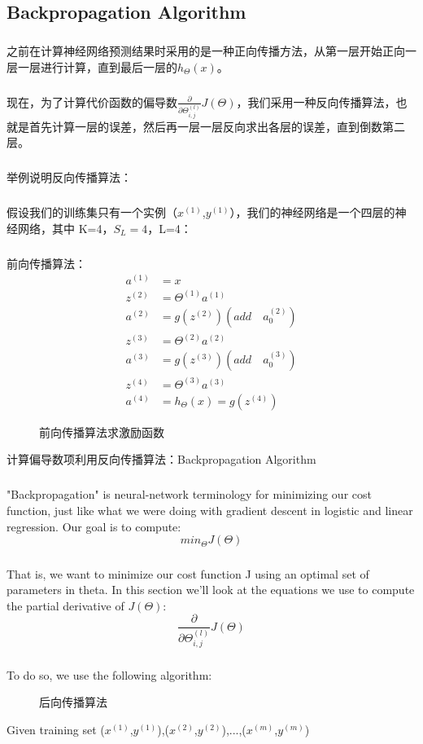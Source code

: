 \documentclass{article}
\begin{document}
\begin{CJK}{UTF8}{gbsn}
\subsection{Backpropagation Algorithm}
\subparagraph{}
之前在计算神经网络预测结果时采用的是一种正向传播方法，从第一层开始正向一层一层进行计算，直到最后一层的$h_\Theta(x)$。
\subparagraph{}
现在，为了计算代价函数的偏导数$\frac{\partial}{\partial\Theta_{i,j}^{(l)}}J(\Theta)$，我们采用一种反向传播算法，也就是首先计算一层的误差，然后再一层一层反向求出各层的误差，直到倒数第二层。
\subparagraph{}
举例说明反向传播算法：
\subparagraph{}
假设我们的训练集只有一个实例（$x^{(1)}$,$y^{(1)}$），我们的神经网络是一个四层的神经网络，其中 K=4，$S_L=4$，L=4：
\subparagraph{}
前向传播算法：
\begin{align}
a^{(1)} & =x \\
z^{(2)} & =\Theta^{(1)}a^{(1)} \\
a^{(2)} & =g(z^{(2)})(add\quad{a_0^{(2)}}) \\
z^{(3)} & =\Theta^{(2)}a^{(2)} \\
a^{(3)} & =g(z^{(3)})(add\quad{a_0^{(3)}}) \\
z^{(4)} & =\Theta^{(3)}a^{(3)} \\
a^{(4)} & =h_\Theta(x)=g(z^{(4)})
\end{align}
\begin{figure}[H]
\caption{前向传播算法求激励函数}
\label{fig:504}
\end{figure}
计算偏导数项利用反向传播算法：Backpropagation Algorithm
\subparagraph{}
"Backpropagation" is neural-network terminology for minimizing our cost function, just like what we were doing with gradient descent in logistic and linear regression. Our goal is to compute:
\begin{equation}
min_{\Theta}J(\Theta)
\end{equation}
\subparagraph{}
That is, we want to minimize our cost function J using an optimal set of parameters in theta. In this section we'll look at the equations we use to compute the partial derivative of $J(\Theta)$:
\begin{equation}
\frac{\partial}{\partial\Theta_{i,j}^{(l)}}J(\Theta)
\end{equation}
\subparagraph{}
To do so, we use the following algorithm:
\begin{figure}[H]
\caption{后向传播算法}
\label{fig:507}
\end{figure}
Given training set {($x^{(1)}$,$y^{(1)}$),($x^{(2)}$,$y^{(2)}$),...,($x^{(m)}$,$y^{(m)}$)}

\end{CJK}
\end{document}
